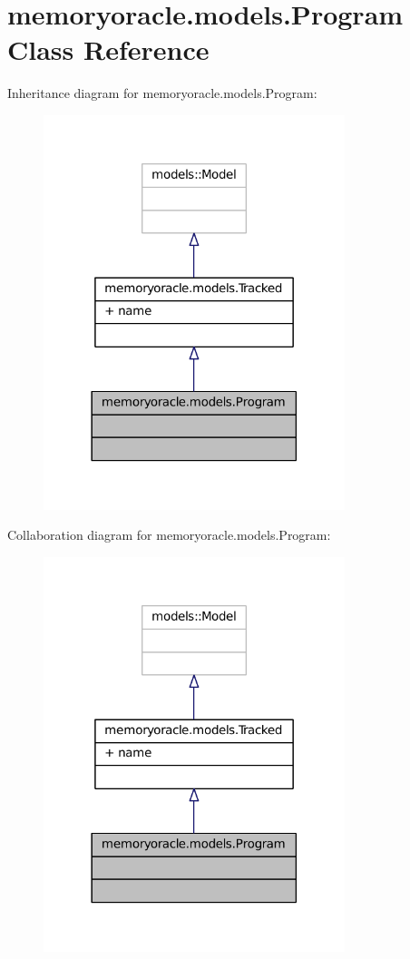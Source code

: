 \hypertarget{classmemoryoracle_1_1models_1_1Program}{}\section{memoryoracle.\+models.\+Program Class Reference}
\label{classmemoryoracle_1_1models_1_1Program}


Inheritance diagram for memoryoracle.\+models.\+Program\+:\nopagebreak
\begin{figure}[H]
\begin{center}
\leavevmode
\includegraphics[width=249pt]{classmemoryoracle_1_1models_1_1Program__inherit__graph}
\end{center}
\end{figure}


Collaboration diagram for memoryoracle.\+models.\+Program\+:\nopagebreak
\begin{figure}[H]
\begin{center}
\leavevmode
\includegraphics[width=249pt]{classmemoryoracle_1_1models_1_1Program__coll__graph}
\end{center}
\end{figure}
